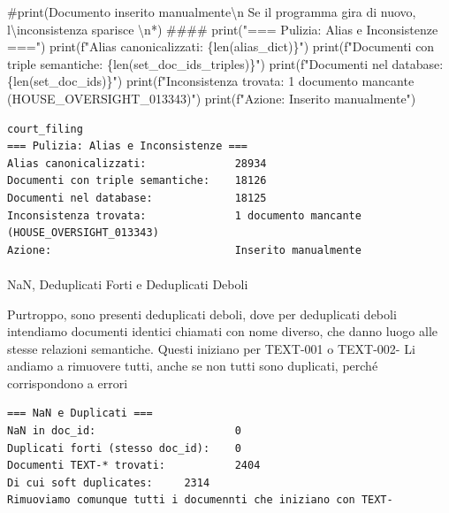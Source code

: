 \documentclass[
  italian,
  a4paper,
]{article}
\makeatletter
\let\oldparagraph\paragraph
\renewcommand{\paragraph}{
    \@ifstar
      \xxxParagraphStar
      \xxxParagraphNoStar
  }
\newcommand{\xxxParagraphStar}[1]{\oldparagraph*{#1}\mbox{}}
\newcommand{\xxxParagraphNoStar}[1]{\oldparagraph{#1}\mbox{}}
\newenvironment{Shaded}{\begin{snugshade}}{\end{snugshade}}
\newcommand{\BuiltInTok}[1]{\textcolor[rgb]{0.00,0.23,0.31}{#1}}
\newcommand{\CommentTok}[1]{\textcolor[rgb]{0.37,0.37,0.37}{#1}}
\newcommand{\NormalTok}[1]{\textcolor[rgb]{0.00,0.23,0.31}{#1}}
\newcommand{\SpecialCharTok}[1]{\textcolor[rgb]{0.37,0.37,0.37}{#1}}
\newcommand{\SpecialStringTok}[1]{\textcolor[rgb]{0.13,0.47,0.30}{#1}}
\newcommand{\StringTok}[1]{\textcolor[rgb]{0.13,0.47,0.30}{#1}}
\makeatother
\begin{document}
\begin{Shaded}
\begin{Highlighting}[]
\CommentTok{\#print(\textquotesingle{}Documento inserito manualmente\textbackslash{}n Se il programma gira di nuovo, l\textbackslash{}\textquotesingle{}inconsistenza sparisce \textbackslash{}n*\textquotesingle{})}
\CommentTok{\#\#\#\# }
\BuiltInTok{print}\NormalTok{(}\StringTok{"=== Pulizia: Alias e Inconsistenze ==="}\NormalTok{)}
\BuiltInTok{print}\NormalTok{(}\SpecialStringTok{f"Alias canonicalizzati:              }\SpecialCharTok{\{}\BuiltInTok{len}\NormalTok{(alias\_dict)}\SpecialCharTok{\}}\SpecialStringTok{"}\NormalTok{)}
\BuiltInTok{print}\NormalTok{(}\SpecialStringTok{f"Documenti con triple semantiche:    }\SpecialCharTok{\{}\BuiltInTok{len}\NormalTok{(set\_doc\_ids\_triples)}\SpecialCharTok{\}}\SpecialStringTok{"}\NormalTok{)}
\BuiltInTok{print}\NormalTok{(}\SpecialStringTok{f"Documenti nel database:             }\SpecialCharTok{\{}\BuiltInTok{len}\NormalTok{(set\_doc\_ids)}\SpecialCharTok{\}}\SpecialStringTok{"}\NormalTok{)}
\BuiltInTok{print}\NormalTok{(}\SpecialStringTok{f"Inconsistenza trovata:              1 documento mancante (HOUSE\_OVERSIGHT\_013343)"}\NormalTok{)}
\BuiltInTok{print}\NormalTok{(}\SpecialStringTok{f"Azione:                             Inserito manualmente"}\NormalTok{)}
\end{Highlighting}
\end{Shaded}

\begin{verbatim}
court_filing
=== Pulizia: Alias e Inconsistenze ===
Alias canonicalizzati:              28934
Documenti con triple semantiche:    18126
Documenti nel database:             18125
Inconsistenza trovata:              1 documento mancante (HOUSE_OVERSIGHT_013343)
Azione:                             Inserito manualmente
\end{verbatim}

\paragraph{NaN, Deduplicati Forti e Deduplicati
Deboli}\label{nan-deduplicati-forti-e-deduplicati-deboli}

Purtroppo, sono presenti deduplicati deboli, dove per deduplicati deboli
intendiamo documenti identici chiamati con nome diverso, che danno luogo
alle stesse relazioni semantiche. Questi iniziano per TEXT-001 o
TEXT-002- Li andiamo a rimuovere tutti, anche se non tutti sono
duplicati, perché corrispondono a errori

\begin{verbatim}
=== NaN e Duplicati ===
NaN in doc_id:                      0
Duplicati forti (stesso doc_id):    0
Documenti TEXT-* trovati:           2404
Di cui soft duplicates:     2314
Rimuoviamo comunque tutti i documennti che iniziano con TEXT-
\end{verbatim}
\end{document}

